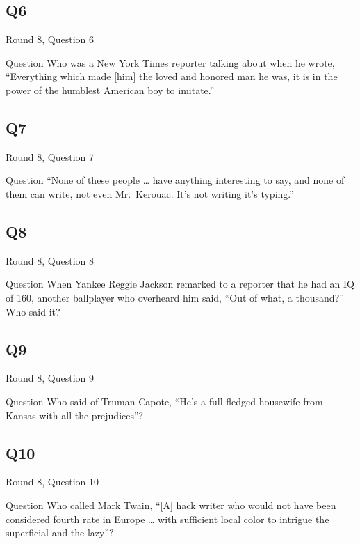 \documentclass[11pt]{beamer}
\begin{document}
\subsection*{Q6}
\begin{frame}[t]{Round 8, Question 6}
\begin{block}{Question}
Who was a New York Times reporter talking about when he wrote, ``Everything which made [him] the loved and honored man he was, it is in the power of the humblest American boy to imitate.''
\end{block}
\end{frame}
\subsection*{Q7}
\begin{frame}[t]{Round 8, Question 7}
\begin{block}{Question}
``None of these people \ldots{} have anything interesting to say, and none of them can write, not even Mr.\ Kerouac. It's not writing it's typing.''
\end{block}
\end{frame}
\subsection*{Q8}
\begin{frame}[t]{Round 8, Question 8}
\begin{block}{Question}
When Yankee Reggie Jackson remarked to a reporter that he had an IQ of 160, another ballplayer who overheard him said, ``Out of what, a thousand?'' Who said it?
\end{block}
\end{frame}
\subsection*{Q9}
\begin{frame}[t]{Round 8, Question 9}
\begin{block}{Question}
Who said of Truman Capote, ``He's a full-fledged housewife from Kansas with all the prejudices''?
\end{block}
\end{frame}
\subsection*{Q10}
\begin{frame}[t]{Round 8, Question 10}
\begin{block}{Question}
Who called Mark Twain, ``[A] hack writer who would not have been considered fourth rate in Europe \ldots{} with sufficient local color to intrigue the superficial and the lazy''?
\end{block}
\end{frame}
\end{document}
